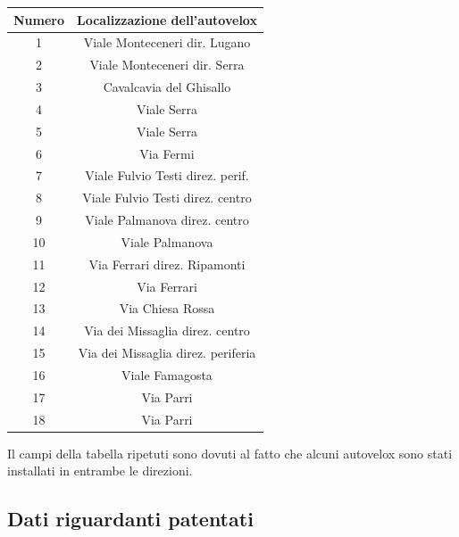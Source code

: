 \documentclass[a4paper]{report}
\begin{document}
\begin{center}
    \def\arraystretch{1.5}%
    \begin{tabular}{ |c|c| } 
    \hline
    Numero & Localizzazione dell'autovelox \\ 
    \hline
    \rowcolor{TableGray}
    1   &   Viale Monteceneri  dir. Lugano\\
    2   &   Viale Monteceneri dir. Serra\\
    \rowcolor{TableGray}
    3   &   Cavalcavia del Ghisallo\\
    4   &   Viale Serra \\
    \rowcolor{TableGray}
    5   &   Viale Serra\\
    6   &   Via Fermi\\
    \rowcolor{TableGray}
    7   &   Viale Fulvio Testi direz. perif.\\
    8   &   Viale Fulvio Testi direz. centro\\
    \rowcolor{TableGray}
    9   &   Viale Palmanova  direz. centro\\
    10  &   Viale Palmanova\\
    \rowcolor{TableGray}
    11  &   Via Ferrari direz. Ripamonti\\
    12  &   Via Ferrari\\
    \rowcolor{TableGray}
    13  &   Via Chiesa Rossa\\
    14  &   Via dei Missaglia direz. centro\\
    \rowcolor{TableGray}
    15  &   Via dei Missaglia direz. periferia\\
    16  &   Viale Famagosta\\
    \rowcolor{TableGray}
    17  &   Via Parri\\
    18  &   Via Parri\\
    \hline
    \end{tabular}
    \label{ztl-milano}
\end{center}

Il campi della tabella ripetuti sono dovuti al fatto che alcuni autovelox sono stati installati in entrambe le direzioni.

\subsection{Dati riguardanti patentati}
\end{document}
